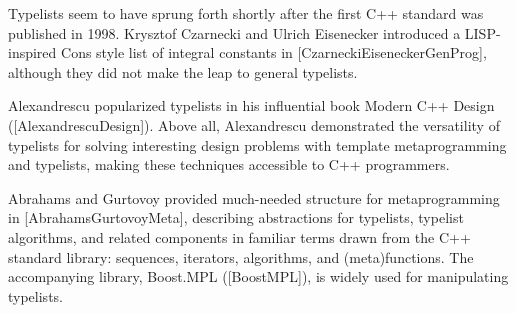 Typelists seem to have sprung forth shortly after the first C++ standard was published in 1998. Krysztof Czarnecki and Ulrich Eisenecker introduced a LISP-inspired Cons style list of integral constants in [CzarneckiEiseneckerGenProg], although they did not make the leap to general typelists.

Alexandrescu popularized typelists in his influential book Modern C++ Design ([AlexandrescuDesign]). Above all, Alexandrescu demonstrated the versatility of typelists for solving interesting design problems with template metaprogramming and typelists, making these techniques accessible to C++ programmers.

Abrahams and Gurtovoy provided much-needed structure for metaprogramming in [AbrahamsGurtovoyMeta], describing abstractions for typelists, typelist algorithms, and related components in familiar terms drawn from the C++ standard library: sequences, iterators, algorithms, and (meta)functions. The accompanying library, Boost.MPL ([BoostMPL]), is widely used for manipulating typelists.